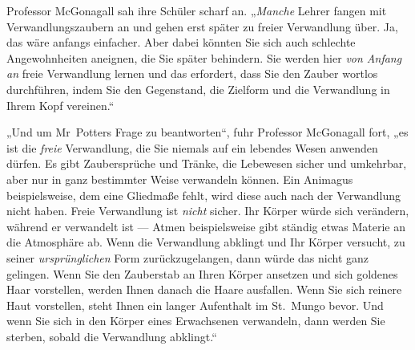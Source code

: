 Professor McGonagall sah ihre Schüler scharf an.
„\emph{Manche} Lehrer fangen mit Verwandlungszaubern an und gehen erst später zu freier Verwandlung über. Ja, das wäre anfangs einfacher. Aber dabei könnten Sie sich auch schlechte Angewohnheiten aneignen, die Sie später behindern. Sie werden hier \emph{von Anfang an} freie Verwandlung lernen und das erfordert, dass Sie den Zauber wortlos durchführen, indem Sie den Gegenstand, die Zielform und die Verwandlung in Ihrem Kopf vereinen.“

„Und um Mr~Potters Frage zu beantworten“, fuhr Professor McGonagall fort, „es ist die \emph{freie} Verwandlung, die Sie niemals auf ein lebendes Wesen anwenden dürfen. Es gibt Zaubersprüche und Tränke, die Lebewesen sicher und umkehrbar, aber nur in ganz bestimmter Weise verwandeln können. Ein Animagus beispielsweise, dem eine Gliedmaße fehlt, wird diese auch nach der Verwandlung nicht haben. Freie Verwandlung ist \emph{nicht} sicher. Ihr Körper würde sich verändern, während er verwandelt ist — Atmen beispielsweise gibt ständig etwas Materie an die Atmosphäre ab. Wenn die Verwandlung abklingt und Ihr Körper versucht, zu seiner \emph{ursprünglichen} Form zurückzugelangen, dann würde das nicht ganz gelingen. Wenn Sie den Zauberstab an Ihren Körper ansetzen und sich goldenes Haar vorstellen, werden Ihnen danach die Haare ausfallen. Wenn Sie sich reinere Haut vorstellen, steht Ihnen ein langer Aufenthalt im St.~Mungo bevor. Und wenn Sie sich in den Körper eines Erwachsenen verwandeln, dann werden Sie sterben, sobald die Verwandlung abklingt.“

